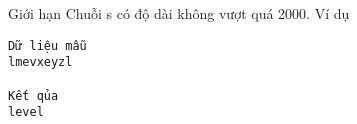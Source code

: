 Giới hạn  
Chuỗi s có độ dài không vượt quá 2000.
   Ví dụ  
\begin{verbatim}
Dữ liệu mẫu
lmevxeyzl

Kết qủa
level
\end{verbatim}